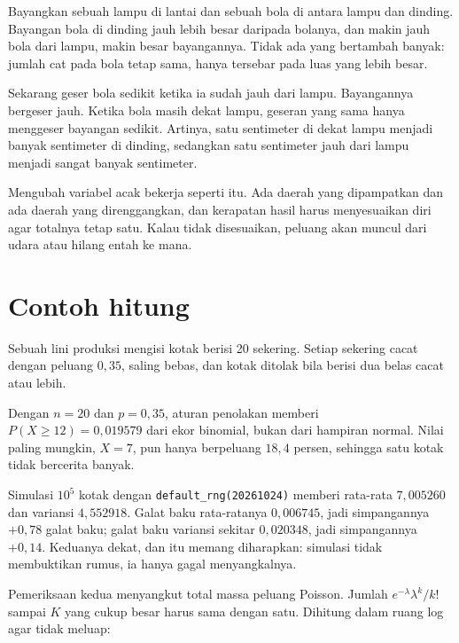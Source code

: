 \begin{untukanak}
Bayangkan sebuah lampu di lantai dan sebuah bola di antara lampu dan dinding.
Bayangan bola di dinding jauh lebih besar daripada bolanya, dan makin jauh bola dari
lampu, makin besar bayangannya. Tidak ada yang bertambah banyak: jumlah cat pada bola
tetap sama, hanya tersebar pada luas yang lebih besar.

Sekarang geser bola sedikit ketika ia sudah jauh dari lampu. Bayangannya bergeser
jauh. Ketika bola masih dekat lampu, geseran yang sama hanya menggeser bayangan
sedikit. Artinya, satu sentimeter di dekat lampu menjadi banyak sentimeter di dinding,
sedangkan satu sentimeter jauh dari lampu menjadi sangat banyak sentimeter.

Mengubah variabel acak bekerja seperti itu. Ada daerah yang dipampatkan dan ada
daerah yang direnggangkan, dan kerapatan hasil harus menyesuaikan diri agar totalnya
tetap satu. Kalau tidak disesuaikan, peluang akan muncul dari udara atau hilang entah
ke mana.
\end{untukanak}

\section{Contoh hitung}

Sebuah lini produksi mengisi kotak berisi 20 sekering. Setiap sekering cacat dengan
peluang $0{,}35$, saling bebas, dan kotak ditolak bila berisi dua belas cacat atau
lebih.

Dengan $n=20$ dan $p=0{,}35$, aturan penolakan memberi $P(X\ge12)=0{,}019579$ dari
ekor binomial, bukan dari hampiran normal. Nilai paling mungkin, $X=7$, pun hanya
berpeluang $18{,}4$ persen, sehingga satu kotak tidak bercerita banyak.

Simulasi $10^5$ kotak dengan \texttt{default\_rng(20261024)} memberi rata-rata
$7{,}005260$ dan variansi $4{,}552918$. Galat baku rata-ratanya $0{,}006745$, jadi
simpangannya $+0{,}78$ galat baku; galat baku variansi sekitar $0{,}020348$, jadi
simpangannya $+0{,}14$. Keduanya dekat, dan itu memang diharapkan: simulasi tidak
membuktikan rumus, ia hanya gagal menyangkalnya.

Pemeriksaan kedua menyangkut total massa peluang Poisson. Jumlah
$e^{-\lambda}\lambda^k/k!$ sampai $K$ yang cukup besar harus sama dengan satu. Dihitung
dalam ruang log agar tidak meluap:

